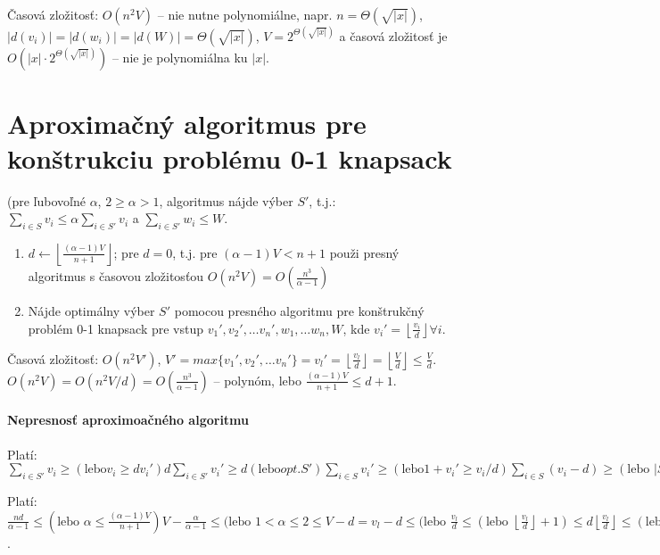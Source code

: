 \documentclass{article}
\begin{document}
\par Časová zložitosť: $O(n^2V)$ -- nie nutne polynomiálne, napr.
$n=\Theta\left(\sqrt{|x|}\right)$, $|d(v_i)| = |d(w_i)| = |d(W)| =
\Theta\left(\sqrt{|x|}\right)$, $V=2^{\Theta\left(\sqrt{|x|}\right)}$ a časová
zložitosť je $O(|x|\cdot 2^{\Theta(\sqrt{|x|})})$ -- nie je polynomiálna ku
$|x|$.


\section{Aproximačný algoritmus pre konštrukciu problému 0-1 knapsack}
(pre ľubovoľné $\alpha$, $2\geq\alpha>1$, algoritmus nájde výber $S'$, t.j.:
$\sum_{i\in S} v_i \leq \alpha\sum_{i\in S'} v_i$ a $\sum_{i \in S'} w_i \leq
W$.

\begin{enumerate}
	\item $d \leftarrow \left\lfloor \frac{(\alpha-1)V}{n+1}\right\rfloor$;
	pre $d=0$, t.j. pre $(\alpha-1)V < n+1$ použi presný algoritmus s
	časovou zložitosťou $O(n^2V)=O(\frac{n^3}{\alpha-1})$

	\item Nájde optimálny výber $S'$ pomocou presného algoritmu pre
	konštrukčný problém 0-1 knapsack pre vstup $v_1', v_2', \ldots v_n',
	w_1, \ldots w_n, W$, kde $v_i' = \left\lfloor\frac{v_i}{d}\right\rfloor
	\forall i$.
\end{enumerate}
\par
Časová zložitosť: $O(n^2V')$, $V'=max \{v_1', v_2', \ldots v_n'\} = v_l' =
\left\lfloor\frac{v_l}{d}\right\rfloor = \left\lfloor \frac{V}{d} \right\rfloor
\leq \frac{V}{d}$. $O(n^2V) = O(n^2V/d) = O(\frac{n^3}{\alpha-1})$ -- polynóm,
lebo $\frac{(\alpha-1)V}{n+1} \leq d+1$.

\paragraph{Nepresnosť aproximoačného algoritmu} Platí: $\sum_{i\in S'} v_i \geq
(\mbox{lebo} v_i \geq dv_i') d \sum_{i\in S'} v_i' \geq d (\mbox{lebo} opt. S')
\sum_{i\in S} v_i'\geq (\mbox{lebo} 1+v_i' \geq v_i/d) \sum_{i\in S} (v_i-d)
\geq (\mbox{lebo } |S|\leq n) \sum_{i \in S} v_i - nd (*)$

\par Platí: $\frac{nd}{\alpha-1} \leq (\mbox{lebo } \alpha\leq
\frac{(\alpha-1)V}{n+1}) V-\frac{\alpha}{\alpha-1} \leq (\mbox{lebo } 1
< \alpha \leq 2 \leq V - d = v_l - d \leq (\mbox{lebo } \frac{v_l}{d} \leq
(\mbox{lebo } \left\lfloor\frac{v_l}{d}\right\rfloor+1) \leq
d\left\lfloor\frac{v_l}{d}\right\rfloor \leq (\mbox{lebo } opt. S') d\sum_{i \in
S} v_i' \leq (\mbox{lebo } dv_i' \leq v_i) \sum_{i \in S'} v_i (**)$.
\end{document}

